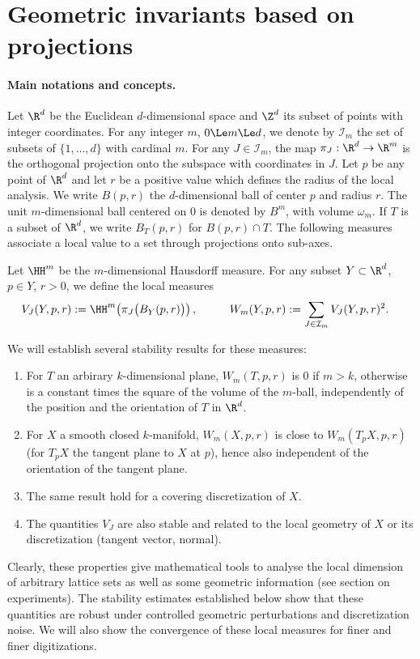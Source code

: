 \section{Geometric invariants based on projections}


\paragraph*{Main notations and concepts.}
Let $\R^d$ be the Euclidean $d$-dimensional space and $\Z^d$ its
subset of points with integer coordinates. For any integer $m$, $0 \Le
m \Le d$, we denote by $\mathcal{I}_m$ the set of subsets of
$\{1,\dots,d\}$ with cardinal $m$. For any $J \in \mathcal{I}_m$, the
map $\pi_J: \R^d \to \R^m$ is the orthogonal projection onto the
subspace with coordinates in $J$. Let $p$ be any point of $\R^d$ and
let $r$ be a positive value which defines the radius of the local
analysis. We write $B(p,r)$ the $d$-dimensional ball of center $p$ and
radius $r$. The unit $m$-dimensional ball centered on $0$ is denoted
by $B^m$, with volume $\omega_m$. If $T$ is a subset of $\R^d$, we write
$B_T(p,r)$ for $B(p,r) \cap T$. The following measures associate a
local value to a set through projections onto sub-axes.

\begin{definition}
  \label{def-local-measures}
  Let $\HH^m$ be the $m$-dimensional
  Hausdorff measure. For any subset $Y \subset \R^d$, $p \in Y$, $r>0$, we define the local measures
  \begin{align}
    V_J(Y,p,r) &:= \HH^m\!\left( \pi_J\bigl(B_Y(p,r)\bigr) \right),
    \quad
    && & W_m(Y,p,r) & := \sum_{J \in \mathcal{I}_m} V_J(Y,p,r)^2.
  \end{align}
\end{definition}

We will establish several stability results for these measures:
\begin{enumerate}
\item For $T$ an arbirary $k$-dimensional plane, $W_m(T,p,r)$ is $0$ if
  $m>k$, otherwise is a constant times the square of the volume of the
  $m$-ball, independently of the position and the orientation of $T$ in $\R^d$.
\item For $X$ a smooth closed $k$-manifold, $W_m(X,p,r)$ is close to
  $W_m(T_p X,p,r)$ (for $T_p X$ the tangent plane to $X$ at $p$),
  hence also independent of the orientation of the tangent plane.
\item The same result hold for a covering discretization of $X$.
\item The quantities $V_J$ are also stable and related to the local
  geometry of $X$ or its discretization (tangent vector, normal).
\end{enumerate}
Clearly, these properties give mathematical tools to analyse the local
dimension of arbitrary lattice sets as well as some geometric
information (see section on experiments). The stability estimates established below show that these quantities are
robust under controlled geometric perturbations and discretization noise. We will also show the convergence of
these local measures for finer and finer digitizations.

